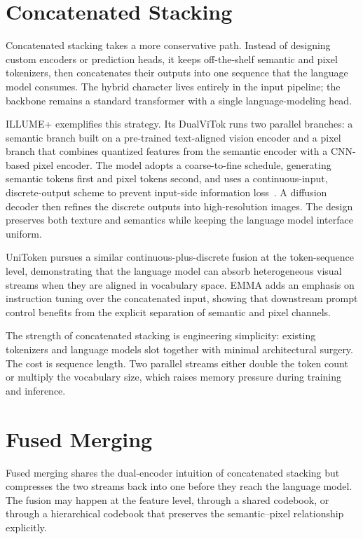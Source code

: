 \documentclass[manuscript,screen,review]{acmart}
\begin{document}
\section{Concatenated Stacking}

Concatenated stacking takes a more conservative path. Instead of
designing custom encoders or prediction heads, it keeps off-the-shelf
semantic and pixel tokenizers, then concatenates their outputs into
one sequence that the language model consumes. The hybrid character
lives entirely in the input pipeline; the backbone remains a standard
transformer with a single language-modeling head.

ILLUME+ exemplifies this strategy. Its DualViTok runs two parallel
branches: a semantic branch built on a pre-trained text-aligned vision
encoder and a pixel branch that combines quantized features from the
semantic encoder with a CNN-based pixel encoder. The model adopts a
coarse-to-fine schedule, generating semantic tokens first and pixel
tokens second, and uses a continuous-input, discrete-output scheme to
prevent input-side information loss~\cite{huang2025illume}. A diffusion
decoder then refines the discrete outputs into high-resolution images.
The design preserves both texture and semantics while keeping the
language model interface uniform.

UniToken pursues a similar continuous-plus-discrete fusion at the
token-sequence level, demonstrating that the language model can absorb
heterogeneous visual streams when they are aligned in vocabulary
space. EMMA adds an emphasis on instruction tuning over the
concatenated input, showing that downstream prompt control benefits
from the explicit separation of semantic and pixel channels.

The strength of concatenated stacking is engineering simplicity:
existing tokenizers and language models slot together with minimal
architectural surgery. The cost is sequence length. Two parallel
streams either double the token count or multiply the vocabulary size,
which raises memory pressure during training and inference.

\section{Fused Merging}

Fused merging shares the dual-encoder intuition of concatenated
stacking but compresses the two streams back into one before they
reach the language model. The fusion may happen at the feature level,
through a shared codebook, or through a hierarchical codebook that
preserves the semantic--pixel relationship explicitly.
\end{document}
